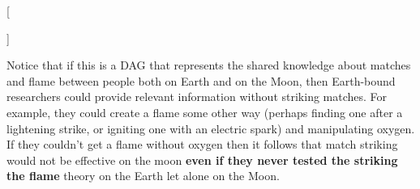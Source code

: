 \documentclass[
]{article}
\begin{document}
{[}


{]}

Notice that if this is a DAG that represents the shared knowledge about
matches and flame between people both on Earth and on the Moon, then
Earth-bound researchers could provide relevant information without
striking matches. For example, they could create a flame some other way
(perhaps finding one after a lightening strike, or igniting one with an
electric spark) and manipulating oxygen. If they couldn't get a flame
without oxygen then it follows that match striking would not be
effective on the moon \textbf{even if they never tested the striking the
flame} theory on the Earth let alone on the Moon.

\printbibliography[title=References]
\end{document}
